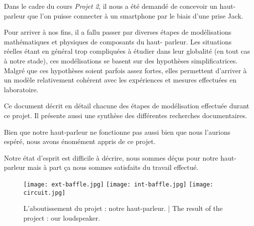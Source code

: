 

\begin{abstract-fr}
Dans le cadre du cours \textit{Projet 2}, il nous a été demandé
de concevoir un haut-parleur que l'on puisse connecter à un smartphone
par le biais d'une prise Jack.

Pour arriver à nos fins, il a fallu passer par diverses étapes
de modélisations mathématiques et physiques de composants du haut-
parleur. Les situations réelles étant en général trop compliquées à étudier
dans leur globalité (en tout cas à notre stade), ces modélisations se basent sur des 
hypothèses simplificatrices. Malgré que ces hypothèses soient parfois assez fortes, 
elles permettent d'arriver à un modèle relativement cohérent avec les expériences et
mesures effectuées en laboratoire.

Ce document décrit en détail chacune des étapes de modélisation effectuée durant
ce projet. Il présente aussi une synthèse des différentes recherches documentaires.

Bien que notre haut-parleur ne fonctionne pas aussi bien que nous l'aurions
espéré, nous avons énomément appris de ce projet.

Notre état d'esprit est difficile à décrire, nous sommes déçus pour notre haut-parleur
mais à part ça nous sommes satisfaits du travail effectué.

\begin{figure}[!htb]
	\centering
	\texttt{[image: ext-baffle.jpg]}
	\texttt{[image: int-baffle.jpg]}
	\texttt{[image: circuit.jpg]}
	\caption{L'aboutissement du projet : notre haut-parleur. | The result of the project : our loudspeaker.}
\end{figure}

\end{abstract-fr}


